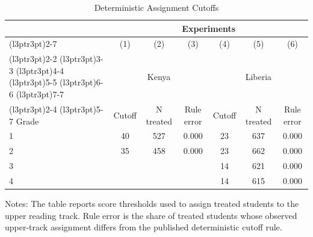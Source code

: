 \begin{table}[H]
\centering
\caption{Deterministic Assignment Cutoffs}
\label{tab:assignment_cutoffs}
\begin{threeparttable}
\begin{tabular}[t]{l c c c c c c}
\toprule
& \multicolumn{6}{c}{Experiments} \\
\cmidrule(l{3pt}r{3pt}){2-7}
 & \multicolumn{1}{c}{(1)} & \multicolumn{1}{c}{(2)} & \multicolumn{1}{c}{(3)} & \multicolumn{1}{c}{(4)} & \multicolumn{1}{c}{(5)} & \multicolumn{1}{c}{(6)} \\
\cmidrule(l{3pt}r{3pt}){2-2} \cmidrule(l{3pt}r{3pt}){3-3} \cmidrule(l{3pt}r{3pt}){4-4} \cmidrule(l{3pt}r{3pt}){5-5} \cmidrule(l{3pt}r{3pt}){6-6} \cmidrule(l{3pt}r{3pt}){7-7}
& \multicolumn{3}{c}{Kenya} & \multicolumn{3}{c}{Liberia} \\
\cmidrule(l{3pt}r{3pt}){2-4} \cmidrule(l{3pt}r{3pt}){5-7}
Grade & Cutoff & N treated & Rule error & Cutoff & N treated & Rule error \\
\midrule
1 & 40 & 527 & 0.000 & 23 & 637 & 0.000 \\
2 & 35 & 458 & 0.000 & 23 & 662 & 0.000 \\
3 &  &  &  & 14 & 621 & 0.000 \\
4 &  &  &  & 14 & 615 & 0.000 \\
\bottomrule
\end{tabular}
\begin{tablenotes}[para]
\item Notes: The table reports score thresholds used to assign treated students to the upper reading track. Rule error is the share of treated students whose observed upper-track assignment differs from the published deterministic cutoff rule.
\end{tablenotes}
\end{threeparttable}
\end{table}
